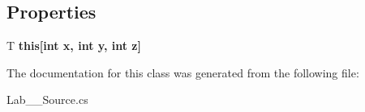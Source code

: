 \subsection*{Properties}
\begin{DoxyCompactItemize}
\item 
\mbox{\label{class_lab__3_1_1_matrix_a6f092832b76bfe7d6e5d25f5e92d986d}} 
T {\bfseries this\mbox{[}int x, int y, int z\mbox{]}}
\end{DoxyCompactItemize}


The documentation for this class was generated from the following file\+:\begin{DoxyCompactItemize}
\item 
Lab\+\_\+\_\+\+Source.\+cs\end{DoxyCompactItemize}

